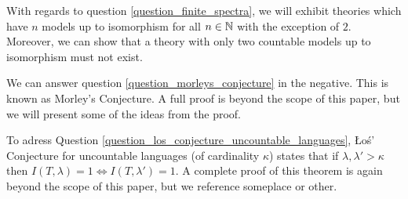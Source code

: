 With regards to question \ref{question_finite_spectra}, we will exhibit theories which have \(n\) models up to isomorphism for all \(n \in \mathbb{N}\) with the exception of \(2\).
Moreover, we can show that a theory with only two countable models up to isomorphism must not exist. 


We can answer question \ref{question_morleys_conjecture} in the negative. This is known as Morley's Conjecture. A full proof is beyond the scope of this paper, but we will present some of the ideas from the proof. 

To adress Question \ref{question_los_conjecture_uncountable_languages}, \L o\'s' Conjecture for uncountable languages (of cardinality \(\kappa\)) states that if \(\lambda, \lambda' >\kappa\) then \(I(T, \lambda) = 1 \iff I(T, \lambda') = 1\). 
A complete proof of this theorem is again beyond the scope of this paper, but we reference {\color{red}someplace or other.} %

